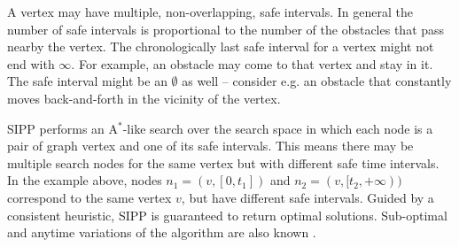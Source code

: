 \documentclass[review]{elsarticle}
\newcommand\roni[1]{\nb{\textbf{Roni:}}{green}{#1}}
\newcommand\dor[1]{\nb{\textbf{Dor:}}{Fuchsia}{#1}}
\newcommand{\sipp}{\ac{SIPP}\xspace}
\newcommand{\astar}{A$^*$\xspace}
\begin{document}
A vertex may have multiple, non-overlapping, safe intervals. 
In general the number of safe intervals is proportional to the number of the obstacles that pass nearby the vertex. The chronologically last safe interval for a vertex might not end with $\infty$. For example, an obstacle may come to that vertex and stay in it. The safe interval might be an $\emptyset$ as well -- consider e.g. an obstacle that constantly moves back-and-forth in the vicinity of the vertex. 



\sipp performs an \astar-like search over the search space in which each node is a pair of graph vertex and one of its safe intervals. This means there may be multiple search nodes for the same vertex but with different safe time intervals. In the example above, nodes
$n_1=(v, [0, t_1])$ and $n_2=(v, [t_2, +\infty) )$ 
correspond to the same vertex $v$, but have different safe intervals.
Guided by a consistent heuristic, \sipp is guaranteed to return optimal solutions. 
Sub-optimal and anytime variations of the algorithm are also known \cite{narayanan2012anytime,yakovlev2020revisiting}. %



\end{document}

